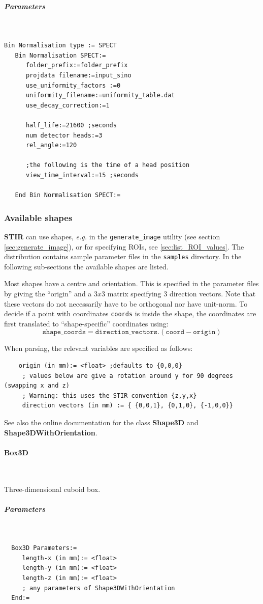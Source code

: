 \documentclass{article}
\newcommand{\subsubsubsection}[1]{\paragraph{#1}\mbox{} \\}
\newcommand{\subsubsubsubsection}[1]{\subparagraph{#1} \mbox{} \\}
\begin{document}
{{{{{{{ \subsubsubsubsection{Parameters}
}
\begin{verbatim}
Bin Normalisation type := SPECT
   Bin Normalisation SPECT:=
      folder_prefix:=folder_prefix
      projdata filename:=input_sino
      use_uniformity_factors :=0
      uniformity_filename:=uniformity_table.dat
      use_decay_correction:=1
     
      half_life:=21600 ;seconds
      num detector heads:=3
      rel_angle:=120
      
      ;the following is the time of a head position
      view_time_interval:=15 ;seconds

   End Bin Normalisation SPECT:=
\end{verbatim}


\subsubsection{
Available shapes}
\label{sec:shapes}
\textbf{STIR} can use shapes, \textit{e.g.} in the \texttt{generate\_image}
utility (see section \ref{sec:generate_image}), or for specifying ROIs, see \ref{sec:list_ROI_values}.
The distribution contains sample parameter files in the
\texttt{samples} directory. In the following sub-sections the available shapes are listed.

Most shapes have a centre and orientation. This is specified in the parameter files
by giving the ``origin'' and a $3x3$ matrix specifying $3$ direction vectors.
Note that these vectors do not necessarily have to be orthogonal nor have unit-norm.
To decide if a point with coordinates \texttt{coords} is inside the shape, the
coordinates are first translated to ``shape-specific'' coordinates using:
\[
\mathtt{shape\_coords} = \mathtt{direction\_vectors}. (\mathtt{coord}-\mathtt{origin})
\]

When parsing, the relevant variables are specified as follows:
\begin{verbatim}
    origin (in mm):= <float> ;defaults to {0,0,0}
     ; values below are give a rotation around y for 90 degrees (swapping x and z)
     ; Warning: this uses the STIR convention {z,y,x}
     direction vectors (in mm) := { {0,0,1}, {0,1,0}, {-1,0,0}}
\end{verbatim}

See also the online documentation for the class \textbf{Shape3D} and
\textbf{Shape3DWithOrientation}.

{ \subsubsubsection{Box3D}
}
Three-dimensional cuboid box.
{ \subsubsubsubsection{Parameters}
}
\begin{verbatim}
  Box3D Parameters:=
     length-x (in mm):= <float>
     length-y (in mm):= <float>
     length-z (in mm):= <float>
     ; any parameters of Shape3DWithOrientation
  End:=
\end{verbatim}

}}}}}}
\end{document}
